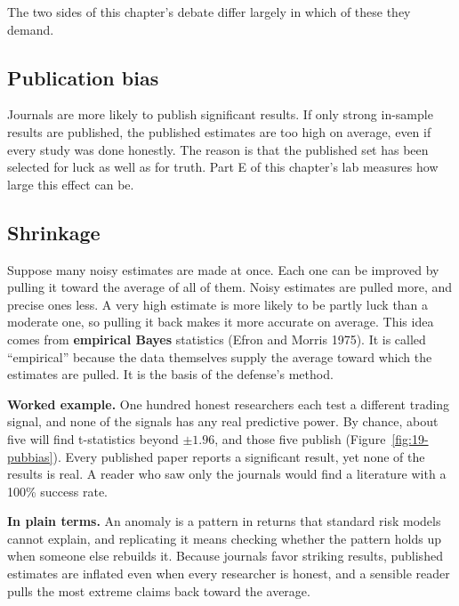 The two sides of this chapter's debate differ largely in which of these they demand.

\subsection{Publication bias}

Journals are more likely to publish significant results. If only strong in-sample results are published, the published estimates are too high on average, even if every study was done honestly. The reason is that the published set has been selected for luck as well as for truth. Part E of this chapter's lab measures how large this effect can be.

\subsection{Shrinkage}

Suppose many noisy estimates are made at once. Each one can be improved by pulling it toward the average of all of them. Noisy estimates are pulled more, and precise ones less. A very high estimate is more likely to be partly luck than a moderate one, so pulling it back makes it more accurate on average. This idea comes from \textbf{empirical Bayes} statistics (Efron and Morris 1975). It is called ``empirical'' because the data themselves supply the average toward which the estimates are pulled. It is the basis of the defense's method.

\textbf{Worked example.} One hundred honest researchers each test a different trading signal, and none of the signals has any real predictive power. By chance, about five will find t-statistics beyond $\pm 1.96$, and those five publish (Figure~\ref{fig:19-pubbias}). Every published paper reports a significant result, yet none of the results is real. A reader who saw only the journals would find a literature with a 100\% success rate.

\noindent\textbf{In plain terms.} An anomaly is a pattern in returns that standard risk models cannot explain, and replicating it means checking whether the pattern holds up when someone else rebuilds it. Because journals favor striking results, published estimates are inflated even when every researcher is honest, and a sensible reader pulls the most extreme claims back toward the average.


